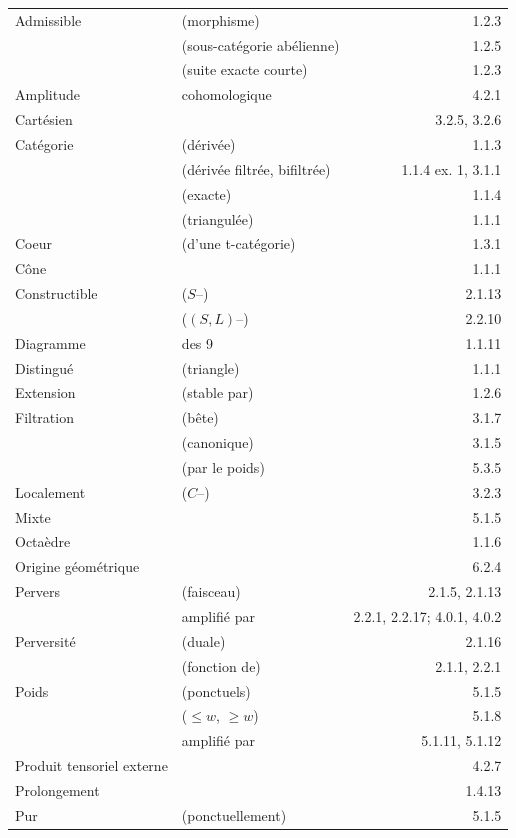 \documentclass[12pt,a4paper]{article}
\theoremstyle{plain}
\theoremstyle{definition}
\theoremstyle{remark}
\begin{document}
\begin{tabular}{lp{8cm}r}
Admissible & (morphisme) & 1.2.3 \\
& (sous-cat\'egorie ab\'elienne) & 1.2.5 \\
& (suite exacte courte) & 1.2.3 \\[4pt]
Amplitude & cohomologique & 4.2.1 \\[4pt]
Cart\'esien & & 3.2.5, 3.2.6 \\[4pt]
Cat\'egorie & (d\'eriv\'ee) & 1.1.3 \\
& (d\'eriv\'ee filtr\'ee, bifiltr\'ee) & 1.1.4 ex. 1, 3.1.1 \\
& (exacte) & 1.1.4 \\
& (triangul\'ee) & 1.1.1 \\[4pt]
Coeur & (d'une t-cat\'egorie) & 1.3.1 \\
C\^one & & 1.1.1 \\[4pt]
Constructible & ($S$--) & 2.1.13 \\
& ($(S, L)$--) & 2.2.10 \\[4pt]
Diagramme & des 9 & 1.1.11 \\
Distingu\'e & (triangle) & 1.1.1 \\[4pt]
Extension & (stable par) & 1.2.6 \\[4pt]
Filtration & (b\^ete) & 3.1.7 \\
& (canonique) & 3.1.5 \\
& (par le poids) & 5.3.5 \\[4pt]
Localement & ($C$--) & 3.2.3 \\[4pt]
Mixte & & 5.1.5 \\[4pt]
Octa\`edre & & 1.1.6 \\
Origine g\'eom\'etrique & & 6.2.4 \\[4pt]
Pervers & (faisceau) & 2.1.5, 2.1.13 \\
& \quad amplifi\'e par & 2.2.1, 2.2.17; 4.0.1, 4.0.2 \\[4pt]
Perversit\'e & (duale) & 2.1.16 \\
& (fonction de) & 2.1.1, 2.2.1 \\[4pt]
Poids & (ponctuels) & 5.1.5 \\
& ($\leq w$, $\geq w$) & 5.1.8 \\
& \quad amplifi\'e par & 5.1.11, 5.1.12 \\[4pt]
Produit tensoriel externe & & 4.2.7 \\[4pt]
Prolongement & & 1.4.13 \\[4pt]
Pur & (ponctuellement) & 5.1.5 \\

\end{tabular}
\end{document}
